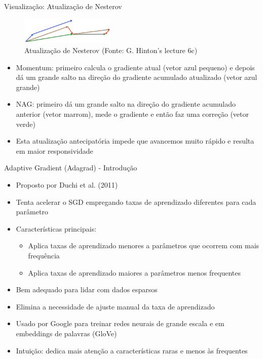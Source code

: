 \documentclass[aspectratio=1610]{beamer}
\begin{document}
\begin{frame}{Visualização: Atualização de Nesterov}
\begin{figure}
\centering
\includegraphics[width=0.4\textwidth]{figures/nesterov_update.png}
\caption{Atualização de Nesterov (Fonte: G. Hinton's lecture 6c)}
\end{figure}

\begin{itemize}
    \item Momentum: primeiro calcula o gradiente atual (vetor azul pequeno) e depois dá um grande salto na direção do gradiente acumulado atualizado (vetor azul grande)
    \item NAG: primeiro dá um grande salto na direção do gradiente acumulado anterior (vetor marrom), mede o gradiente e então faz uma correção (vetor verde)
    \item Esta atualização antecipatória impede que avancemos muito rápido e resulta em maior responsividade
\end{itemize}
\end{frame}

\begin{frame}{Adaptive Gradient (Adagrad) - Introdução}
\begin{itemize}
    \item Proposto por Duchi et al. (2011)
    \item Tenta acelerar o SGD empregando taxas de aprendizado diferentes para cada parâmetro
    \item Características principais:
    \begin{itemize}
        \item Aplica taxas de aprendizado menores a parâmetros que ocorrem com mais frequência
        \item Aplica taxas de aprendizado maiores a parâmetros menos frequentes
    \end{itemize}
    \item Bem adequado para lidar com dados esparsos
    \item Elimina a necessidade de ajuste manual da taxa de aprendizado
    \item Usado por Google para treinar redes neurais de grande escala e em embeddings de palavras (GloVe)
    \item Intuição: dedica mais atenção a características raras e menos às frequentes
\end{itemize}
\end{frame}
\end{document}
